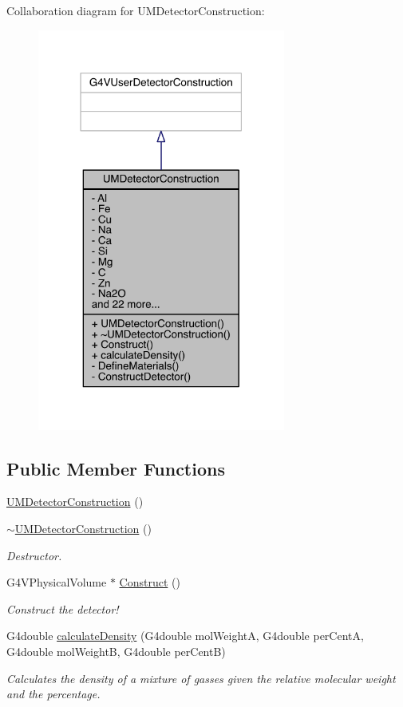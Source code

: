Collaboration diagram for U\+M\+Detector\+Construction\+:
\nopagebreak
\begin{figure}[H]
\begin{center}
\leavevmode
\includegraphics[width=231pt]{classUMDetectorConstruction__coll__graph}
\end{center}
\end{figure}
\subsection*{Public Member Functions}
\begin{DoxyCompactItemize}
\item 
\hyperlink{classUMDetectorConstruction_aa8795834e193baddddffe705108a0679}{U\+M\+Detector\+Construction} ()
\item 
\hyperlink{classUMDetectorConstruction_a768e4d33116b75dc4a4d48eaff6dd7ae}{$\sim$\+U\+M\+Detector\+Construction} ()
\begin{DoxyCompactList}\small\item\em Destructor. \end{DoxyCompactList}\item 
G4\+V\+Physical\+Volume $\ast$ \hyperlink{classUMDetectorConstruction_afc5538d03478fa25e9cf4337253f7d6f}{Construct} ()
\begin{DoxyCompactList}\small\item\em Construct the detector! \end{DoxyCompactList}\item 
G4double \hyperlink{classUMDetectorConstruction_ab95efe22580d366e69d32811b827a715}{calculate\+Density} (G4double mol\+Weight\+A, G4double per\+Cent\+A, G4double mol\+Weight\+B, G4double per\+Cent\+B)
\begin{DoxyCompactList}\small\item\em Calculates the density of a mixture of gasses given the relative molecular weight and the percentage. \end{DoxyCompactList}\end{DoxyCompactItemize}
